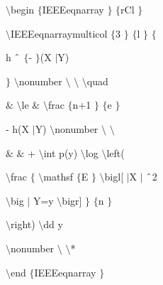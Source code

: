 \vspace{12pt}
\vspace{12pt}
\noindent 
 $  \setminus  $begin $  \{  $IEEEeqnarray $  \}  $ $  \{  $rCl $  \}  $ \par
\vspace{12pt}
\noindent 
 $  \setminus  $IEEEeqnarraymulticol $  \{  $3 $  \}  $ $  \{  $l $  \}  $ $  \{  $ \par
\vspace{12pt}
\noindent 
h $  \string^  $ $  \{  $- $  \}  $(X $  \vert  $Y) \par
\vspace{12pt}
\noindent 
 $  \}  $ $  \setminus  $nonumber $  \setminus  $ $  \setminus  $ $  \setminus  $quad \par
\vspace{12pt}
\noindent 
 $  \&  $  $  \setminus  $le  $  \&  $  $  \setminus  $frac $  \{  $n+1 $  \}  $ $  \{  $e $  \}  $ \par
\vspace{12pt}
\noindent 
- h(X $  \vert  $Y)  $  \setminus  $nonumber $  \setminus  $ $  \setminus  $ \par
\vspace{12pt}
\noindent 
 $  \&  $ $  \&  $ +  $  \setminus  $int p(y)  $  \setminus  $log  $  \setminus  $left( \par
\vspace{12pt}
\noindent 
 $  \setminus  $frac $  \{  $ $  \setminus  $mathsf $  \{  $E $  \}  $ $  \setminus  $bigl[ $  \vert  $X $  \vert  $ $  \string^  $2 \par
\vspace{12pt}
\noindent 
 $  \setminus  $big $  \vert  $ Y=y $  \setminus  $bigr] $  \}  $ $  \{  $n $  \}  $ \par
\vspace{12pt}
\noindent 
 $  \setminus  $right)  $  \setminus  $dd y \par
\vspace{12pt}
\noindent 
 $  \setminus  $nonumber $  \setminus  $ $  \setminus  $* \par
\vspace{12pt}
\noindent 
 $  \setminus  $end $  \{  $IEEEeqnarray $  \}  $ \par
\vspace{12pt}
\vspace{12pt}
\noindent 
